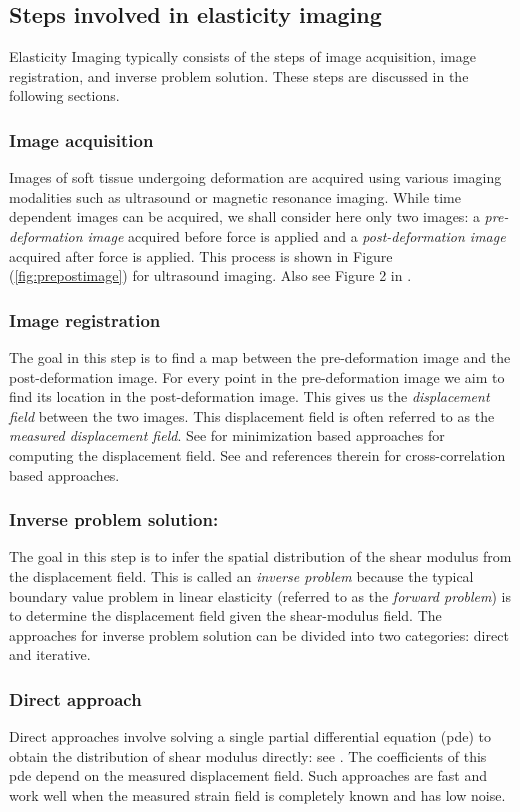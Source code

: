 \documentclass[12pt]{article}
\begin{document}
\subsection{Steps involved in elasticity imaging}
Elasticity Imaging typically consists of  the steps of image acquisition, image registration, and inverse problem solution. These steps are discussed in the following sections.
\subsubsection{Image acquisition} Images of soft tissue undergoing deformation are acquired using various imaging modalities such as ultrasound or magnetic resonance imaging. While time dependent images can be acquired, we shall consider here only two images: a \textit{pre-deformation image} acquired before force is applied and a \textit{post-deformation image} acquired after force is applied. This process is shown in Figure (\ref{fig:prepostimage}) for ultrasound imaging. Also see Figure 2 in \cite{paper:konofagou2004}.
\subsubsection{Image registration} The goal in this step is to find a map between the pre-deformation image and the post-deformation image. For every point in the pre-deformation image we aim to find its location in the post-deformation image. This gives us the \textit{displacement field} between the two images. This displacement field is often referred to as the \textit{measured displacement field}. See \cite{paper:richards2009,paper:gokhale2004,paper:pellot-barakat2004} for minimization based approaches for computing the displacement field. See \cite{paper:ophir1991,paper:ophir1996,paper:alam1998} and references therein for cross-correlation based approaches.
\subsubsection{Inverse problem solution:} The goal in this step is to infer the spatial distribution of the shear modulus from the displacement field. This is called an \textit{inverse problem} because the typical boundary value problem in linear elasticity (referred to as the \textit{forward problem}) is to determine the displacement field given the shear-modulus field. The approaches for inverse problem solution can be divided into two categories: direct and iterative.
\subsubsection{Direct approach} Direct approaches involve solving a single partial differential equation (pde) to obtain the distribution of shear modulus directly: see \cite{paper:raghavan1994,paper:barboneadjwt,paper:albocher}. The coefficients of this pde depend on the measured displacement field. Such approaches are fast and work well when the measured strain field is completely known and has low noise.
\end{document}
